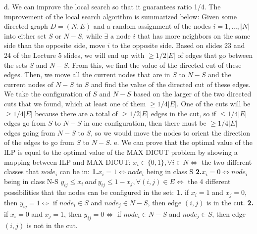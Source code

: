 \documentclass[oneside]{projectpaper} %
\begin{document}
\newline
\newline
{\large d.} We can improve the local search so that it guarantees ratio 1/4. The improvement of the local search algorithm is summarized below:
\newline
\newline
Given some directed graph $D = (N,E)$ and a random assignment of the nodes $i = 1,...,|N|$ into either set $S$ or $N-S$, while $\exists$ a node $i$ that has more neighbors on the same side than the opposite side, move $i$ to the opposite side. Based on slides 23 and 24 of the Lecture 5 slides, we will end up with $\geq 1/2|E|$ of edges that go between the sets $S$ and $N-S$. From this, we find the value of the directed cut of these edges. Then, we move all the current nodes that are in $S$ to $N-S$ and the current nodes of $N-S$ to $S$ and find the value of the directed cut of these edges. We take the configuration of $S$ and $N-S$ based on the larger of the two directed cuts that we found, which at least one of them $\geq 1/4|E|$. One of the cuts will be $\geq 1/4|E|$ because there are a total of $\geq 1/2|E|$ edges in the cut, so if $\leq 1/4|E|$ edges go from $S$ to $N-S$ in one configuration, then there must be $\geq 1/4|E|$ edges going from $N-S$ to $S$, so we would move the nodes to orient the direction of the edges to go from $S$ to $N-S$.
\newline
\newline
{\large e.} We can prove that the optimal value of the ILP is equal to the optimal value of the MAX DICUT problem by showing a mapping between ILP and MAX DICUT: \newline
\newline
$x_i \in \{0,1\}, \forall i \in N \Leftrightarrow$ the two different classes that $node_i$ can be in: \newline
\textbf{1.}$ x_i = 1 \Leftrightarrow node_i$ being in class S \newline
\textbf{2.}$x_i = 0 \Leftrightarrow node_i$ being in class N-S \newline
\newline
$y_{ij} \leq x_i \ and \ y_{ij} \leq 1 - x_j,  \forall (i, j) \in E \Leftrightarrow$ the 4 different possibilities that the nodes can be configured in the set:
\newline
\textbf{1.} if $x_i = 1$ and $x_j = 0$, then $y_{ij} = 1 \Leftrightarrow$ if $node_i \in S$ and $node_j \in N-S$, then edge $(i,j)$ is in the cut.
\newline
\textbf{2.} if $x_i = 0$ and $x_j = 1$, then $y_{ij} = 0 \Leftrightarrow$ if $node_i \in N-S$ and $node_j \in S$, then edge $(i,j)$ is not in the cut.
\end{document}

